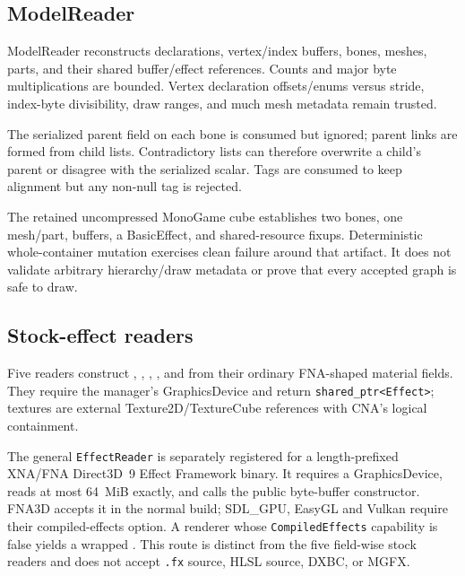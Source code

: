 \subsection{ModelReader}
\label{sec:xnb-model-reader-contract}

ModelReader reconstructs declarations, vertex/index buffers, bones, meshes, parts, and their
shared buffer/effect references. Counts and major byte multiplications are bounded. Vertex
declaration offsets/enums versus stride, index-byte divisibility, draw ranges, and much mesh
metadata remain trusted.

The serialized parent field on each bone is consumed but ignored; parent links are formed from
child lists. Contradictory lists can therefore overwrite a child's parent or disagree with the
serialized scalar. Tags are consumed to keep alignment but any non-null tag is rejected.

The retained uncompressed MonoGame cube establishes two bones, one mesh/part, buffers, a
BasicEffect, and shared-resource fixups. Deterministic whole-container mutation exercises clean
failure around that artifact. It does not validate arbitrary hierarchy/draw metadata or prove
that every accepted graph is safe to draw.

\subsection{Stock-effect readers}
\label{sec:xnb-stock-effect-reader-contract}

Five readers construct , ,
, , and
 from their ordinary FNA-shaped material fields. They require the
manager's GraphicsDevice and return \texttt{shared\_ptr<Effect>}; textures are external
Texture2D/TextureCube references with CNA's logical containment.

The general \texttt{EffectReader} is separately registered for a length-prefixed XNA/FNA
Direct3D~9 Effect Framework binary. It requires a GraphicsDevice, reads at most 64~MiB exactly,
and calls the public  byte-buffer constructor. FNA3D accepts it in the normal
build; SDL\_GPU, EasyGL and Vulkan require their compiled-effects option. A renderer whose
\texttt{CompiledEffects} capability is false yields a wrapped .
This route is distinct from the five field-wise stock readers and does not accept \texttt{.fx}
source, HLSL source, DXBC, or MGFX.

